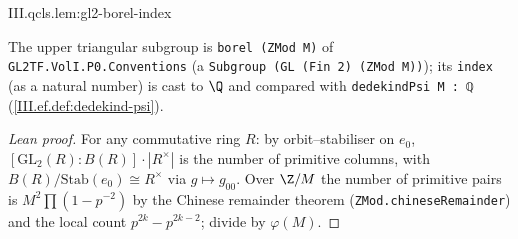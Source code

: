 \begin{lemma}
\end{lemma}
\begin{tfformal}{III.qcls.lem:gl2-borel-index}
\begin{tffidelity}
The upper triangular subgroup is \texttt{borel (ZMod M)} of \texttt{GL2TF.VolI.P0.Conventions} (a \texttt{Subgroup (GL (Fin 2) (ZMod M))}); its \texttt{index} (as a natural number) is cast to $\Q$ and compared with \texttt{dedekindPsi M : ℚ} (\cref{III.ef.def:dedekind-psi}).
\end{tffidelity}
\end{tfformal}
\begin{proof}[Lean proof]
For any commutative ring $R$: by orbit--stabiliser on $e_0$, $[\mathrm{GL}_2(R):B(R)]\cdot|R^\times|$ is the number of primitive columns, with $B(R)/\mathrm{Stab}(e_0)\cong R^\times$ via $g\mapsto g_{00}$. Over $\Z/M$ the number of primitive pairs is $M^2\prod(1-p^{-2})$ by the Chinese remainder theorem (\texttt{ZMod.chineseRemainder}) and the local count $p^{2k}-p^{2k-2}$; divide by $\varphi(M)$.
\end{proof}


